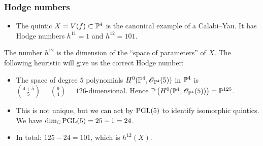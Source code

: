 \begin{frame}
\frametitle{Hodge numbers}

\begin{itemize}
  \item The quintic $X=V(f) \subset \P^4$ is the canonical example of a Calabi--Yau. It has Hodge numbers $h^{11}=1$ and $h^{12}=101$.
\end{itemize}

\begin{remark}[Heuristic]
The number $h^{12}$ is the dimension of the ``space of parameters'' of $X$. The following heuristic will give us the correct Hodge number:
\begin{itemize}
  \item The space of degree $5$ polynomials $H^0(\P^4,\OO_{\P^4}(5))$ in $\P^4$ is $\binom{4+5}{5}=\binom{9}{4}=126$-dimensional. Hence $\P \left(H^0(\P^4,\OO_{\P^4}(5))\right) = \P^{125}$.
  \item This is not unique, but we can act by $\PGL(5)$ to identify isomorphic quintics. We have $\dim_\C \PGL(5)=25-1=24$.
  \item In total: $125-24=101$, which is $h^{12}(X)$.
\end{itemize}
\end{remark}

\end{frame}